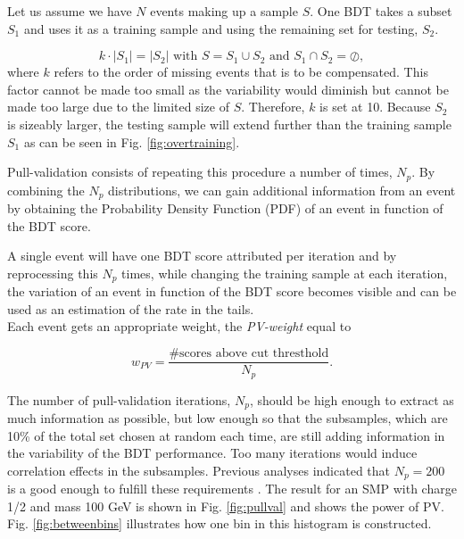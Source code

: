 \noindent Let us assume we have $N$ events making up a sample $S$. One BDT takes a subset $S_1$ and uses it as a training sample and using the remaining set for testing, $S_2$. 

\begin{equation}
k \cdot \left| S_1 \right| = \left| S_2 \right| \textrm{ with } S = S_1 \cup S_2 \textrm{ and } S_1 \cap S_2 = \oslash, 
\end{equation}
where $k$ refers to the order of missing events that is to be compensated. This factor cannot be made too small as the variability would diminish but cannot be made too large due to the limited size of $S$. Therefore, $k$ is set at 10. Because $S_2$ is sizeably larger, the testing sample will extend further than the training sample $S_1$ as can be seen in Fig. \ref{fig:overtraining}. 

Pull-validation consists of repeating this procedure a number of times, $N_p$. By combining the $N_p$ distributions, we can gain additional information from an event by obtaining the Probability Density Function (PDF) of an event in function of the BDT score. 

A single event will have one BDT score attributed per iteration and by reprocessing this $N_p$ times, while changing the training sample at each iteration, the variation of an event in function of the BDT score becomes visible and can be used as an estimation of the rate in the tails.\\

\noindent Each event gets an appropriate weight, the \textit{PV-weight} equal to

\begin{equation}
\label{eq:pullweight}
w_{PV} = \frac{\# \textrm{scores above cut thresthold}}{N_p}.
\end{equation}

The number of pull-validation iterations, $N_p$, should be high enough to extract as much information as possible, but low enough so that the subsamples, which are 10\% of the total set chosen at random each time, are still adding information in the variability of the BDT performance. Too many iterations would induce correlation effects in the subsamples. Previous analyses indicated that $N_p = 200$ is a good enough to fulfill these requirements \cite{Aartsen:2016fep,Aartsen:2015exf}. The result for an SMP with charge 1/2 and mass 100 GeV is shown in Fig. \ref{fig:pullval} and shows the power of PV. Fig. \ref{fig:betweenbins} illustrates how one bin in this histogram is constructed.\\
 
